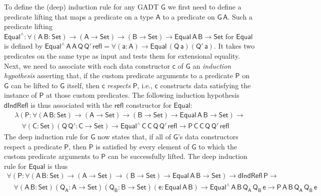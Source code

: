 \documentclass[9pt]{entcs}
\begin{document}
To define the (deep) induction rule for any GADT $\mathsf{G}$ we first
need to define a predicate lifting that maps a predicate on a type
$\mathsf{A}$ to a predicate on $\mathsf{G\,A}$. Such a predicate
lifting $\mathsf{Equal^{\wedge} : \forall (A\,B : Set) \to (A \to Set)
  \to (B \to Set) \to Equal\,A\,B \to Set}$ for $\mathsf{Equal}$ is
defined by $\mathsf{Equal^{\wedge}\,A\,A\,Q\,Q'\,refl = \forall (a :
  A) \to Equal\,(Q\,a)(Q'\,a)}$.  It takes two predicates on the same
type as input and tests them for extensional equality.
%
Next, we need to associate with each data constructor $\mathsf{c}$ of
$\mathsf{G}$ an {\em induction hypothesis} asserting that, if the
custom predicate arguments to a predicate $\mathsf{P}$ on $\mathsf{G}$
can be lifted to $\mathsf{G}$ itself, then $\mathsf{c}$ {\em respects}
$\mathsf{P}$, i.e., $\mathsf{c}$ constructs data satisfying the
instance of $\mathsf{P}$ at those custom predicates. The following
induction hypothesis $\mathsf{dIndRefl}$ is thus associated with the
$\mathsf{refl}$ constructor for $\mathsf{Equal}$:
\begin{equation*}\label{eq:ind-refl}
\begin{array}{l}
\mathsf{\lambda (P : \forall (A\,B : Set) \to (A \to Set) \to (B \to
  Set) \to Equal\,A\,B \to Set) \to} \\ 
\quad\mathsf{\forall (C : Set) (Q\, Q' : C \to Set) \to
  Equal^{\wedge}\,C\,C\,Q\,Q'\,refl \to P\,C\,C\,Q\,Q'\,refl} 
\end{array}
\end{equation*}
The deep induction rule for $\mathsf{G}$ now states that, if all of
$\mathsf{G}$'s data constructors respect a predicate $\mathsf{P}$,
then $\mathsf{P}$ is satisfied by every element of $\mathsf{G}$ to
which the custom predicate arguments to $\mathsf{P}$ can be
successfully lifted.  The deep induction rule for $\mathsf{Equal}$ is
thus
\begin{equation}\label{eq:ind-equal}
\begin{array}{l}
\mathsf{\forall (P : \forall (A\,B : Set) \to (A \to Set) \to (B \to
  Set) \to Equal\,A\,B \to Set) \to dIndRefl\,P \to}\\ \quad 
  \mathsf{\forall (A\,B : Set) (Q_A : A \to Set) (Q_B : B \to Set) (e:
  Equal\,A\,B) \to Equal^{\wedge}\,A\,B\,Q_A\,Q_B\,e \to
  P\,A\,B\,Q_A\,Q_B\,e}
\end{array}
\end{equation}
\end{document}
